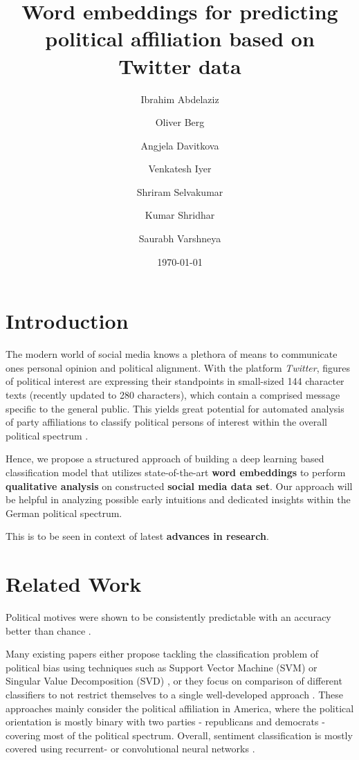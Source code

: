 \documentclass[10pt, oneside]{article}
\title{Word embeddings for predicting political affiliation based on Twitter data}
\author[]{Ibrahim Abdelaziz}
\author[]{Oliver Berg}
\author[]{Angjela Davitkova}
\author[]{Venkatesh Iyer}
\author[]{Shriram Selvakumar}
\author[]{Kumar Shridhar}
\author[]{Saurabh Varshneya}
\affil[1]{Technische Universität Kaiserslautern}
\date{\today}
\begin{document}
\maketitle
\begin{multicols}{2}


\section{Introduction}

The modern world of social media knows a plethora of means to communicate ones personal opinion and political alignment. With the platform \textit{Twitter}, figures of political interest are expressing their standpoints in small-sized 144 character texts (recently updated to 280 characters), which contain a comprised message specific to the general public. This yields great potential for automated analysis of party affiliations to classify political persons of interest within the overall political spectrum \cite{Biessmann2017}.

Hence, we propose a structured approach of building a deep learning based classification model that utilizes state-of-the-art \textbf{word embeddings} \cite{Pelevinala2016} to perform \textbf{qualitative analysis} on constructed \textbf{social media data set}. Our approach will be helpful in analyzing possible early intuitions and dedicated insights within the German political spectrum.

This is to be seen in context of latest \textbf{advances in research}.


\section{Related Work}

Political motives were shown to be consistently predictable with an accuracy better than chance \cite{Biessmann2017}.

Many existing papers either propose tackling the classification problem of political bias using techniques such as Support Vector Machine (SVM) or Singular Value Decomposition (SVD) \cite{Misra2016}, or they focus on comparison of different classifiers to not restrict themselves to a single well-developed approach \cite{Bhanda2009}. These approaches mainly consider the political affiliation in America, where the political orientation is mostly binary with two parties - republicans and democrats - covering most of the political spectrum.
Overall, sentiment classification is mostly covered using recurrent- or convolutional neural networks \cite{Kim2014}.


\end{multicols}
\end{document}
